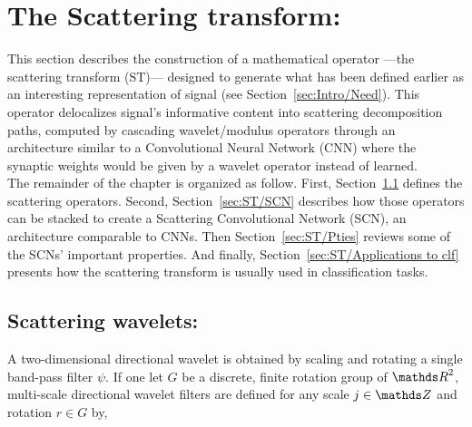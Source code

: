 \documentclass[a4paper,11pt]{report}
\begin{document}
    
\chapter{The Scattering transform:}
  \label{chap:ST}
 
	This section describes the construction of a mathematical operator ---the scattering transform (ST)--- designed to generate what has been defined earlier as an interesting representation of signal (see Section~\ref{sec:Intro/Need}). This operator delocalizes signal's informative content into scattering decomposition paths, computed by cascading wavelet/modulus operators through an architecture similar to a Convolutional Neural Network (CNN) where the synaptic weights would be given by a wavelet operator instead of learned.\\ 
	
	The remainder of the chapter is organized as follow. First, Section~\ref{sec:ST/Scattering wavelets} defines the scattering operators. Second, Section~\ref{sec:ST/SCN} describes how those operators can be stacked to create a Scattering Convolutional Network (SCN), an architecture comparable to CNNs. Then Section~\ref{sec:ST/Pties} reviews some of the SCNs' important properties. And finally, Section~\ref{sec:ST/Applications to clf} presents how the scattering transform is usually used in classification tasks.
	      
		\section{Scattering wavelets:}
			\label{sec:ST/Scattering wavelets}

			A two-dimensional directional wavelet is obtained by scaling and rotating a single band-pass filter $\psi$. If one let $G$ be a discrete, finite rotation group of $\dsR^{2}$, multi-scale directional wavelet filters are defined for any scale $j \in \dsZ$ and rotation $r \in G$ by,
      
\end{document}
